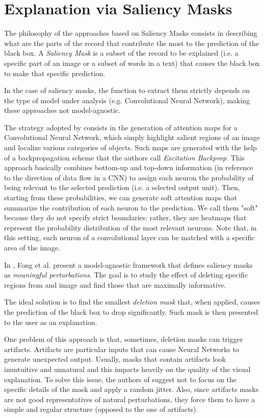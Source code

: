 \documentclass[12pt, twoside, a4paper]{report}
\begin{document}
\section{Explanation via Saliency Masks}

The philosophy of the approaches based on Saliency Masks consists in describing what are the parts of the record that contribute the most to the prediction of the black box. A \textit{Saliency Mask} is a subset of the record to be explained (i.e. a specific part of an image or a subset of words in a text) that causes the black box to make that specific prediction. 

In the case of saliency masks, the function to extract them strictly depends on the type of model under analysis (e.g. Convolutional Neural Network), making these approaches not model-agnostic.
\bigskip

The strategy adopted by \cite{neural-attention} consists in the generation of attention maps for a Convolutional Neural Network, which simply highlight salient regions of an image and localize various categories of objects. Such maps are generated with the help of a backpropagation scheme that the authors call \textit{Excitation Backprop}. This approach basically combines bottom-up and top-down information (in reference to the direction of data flow in a CNN) to assign each neuron the probability of being relevant to the selected prediction (i.e. a selected output unit). Then, starting from these probabilities, we can generate soft attention maps that summarize the contribution of each neuron to the prediction. We call them "soft" because they do not specify strict boundaries: rather, they are heatmaps that represent the probability distribution of the most relevant neurons.
Note that, in this setting, each neuron of a convolutional layer can be matched with a specific area of the image.
\bigskip 

In \cite{fong}, Fong et al. present a model-agnostic framework that defines saliency masks as \textit{meaningful perturbations}. The goal is to study the effect of deleting specific regions from and image and find those that are maximally informative.

The ideal solution is to find the smallest \textit{deletion mask} that, when applied, causes the prediction of the black box to drop significantly. Such mask is then presented to the user as an explanation.

One problem of this approach is that, sometimes, deletion masks can trigger artifacts. Artifacts are particular inputs that can cause Neural Networks to generate unexpected output. Usually, masks that contain artifacts look inuntuitive and unnatural and this impacts heavily on the quality of the visual explanation. 
To solve this issue, the authors of \cite{fong} suggest not to focus on the specific details of the mask and apply a random jitter. Also, since artifacts masks are not good representatives of natural perturbations, they force them to have a simple and regular structure (opposed to the one of artifacts).
\bigskip
\end{document}
